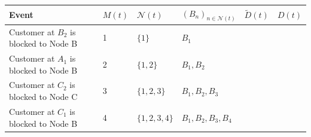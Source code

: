 \documentclass{article}
\begin{document}
\begin{table}
\begin{center}
\begin{tabular}{m{} m{} m{} m{} m{} m{}}
\toprule
\vspace{0.5mm}\large{Event}\vspace{0.5mm} & \vspace{0.5mm}\large{$M(t)$}\vspace{0.5mm} & \vspace{0.5mm}\large{$\mathcal{N}(t)$}\vspace{0.5mm} & \vspace{0.5mm}\large{$(B_n)_{n\in\mathcal{N}(t)}$}\vspace{0.5mm} & \vspace{0.5mm}\large{$\tilde{D}(t)$}\vspace{0.5mm} & \vspace{0.5mm}\large{$D(t)$}\vspace{0.5mm} \\
\midrule
Customer at $B_2$ is blocked to Node B & 1 & $\{1\}$          & $B_1$                & \vspace{1mm} & \vspace{1mm} \\ \midrule
Customer at $A_1$ is blocked to Node B & 2 & $\{1, 2\}$       & $B_1, B_2$           & \vspace{1mm} & \vspace{1mm} \\ \midrule
Customer at $C_2$ is blocked to Node C & 3 & $\{1, 2, 3\}$    & $B_1, B_2, B_3$      & \vspace{1mm} & \vspace{1mm} \\ \midrule
Customer at $C_1$ is blocked to Node B & 4 & $\{1, 2, 3, 4\}$ & $B_1, B_2, B_3, B_4$ & \vspace{1mm} & \vspace{1mm} \\ \midrule

\end{tabular}
\end{center}
\end{table}
\end{document}

